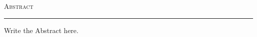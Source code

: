 \thispagestyle{plain}
\vspace*{3cm}
\begin{center}
    \textsc{\LARGE Abstract}

    \rule{5cm}{0.4pt}

    \vspace{1cm}
\end{center}
Write the Abstract here.

\restoregeometry
\newpage